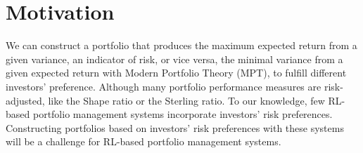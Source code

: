\section {Motivation}
We can construct a portfolio that produces the maximum expected return from a given variance, an indicator of risk, or vice versa, the minimal variance from a given expected return with Modern Portfolio Theory (MPT), \cite{10.2307/2975974} to fulfill different investors' preference.
Although many portfolio performance measures are risk-adjusted\cite{cogneau2009101}, like the Shape ratio\cite{Sharpe49} or the Sterling ratio\cite{magdon2004maximum}. To our knowledge, few RL-based portfolio management systems incorporate investors' risk preferences. Constructing portfolios based on investors' risk preferences with these systems will be a challenge for RL-based portfolio management systems.